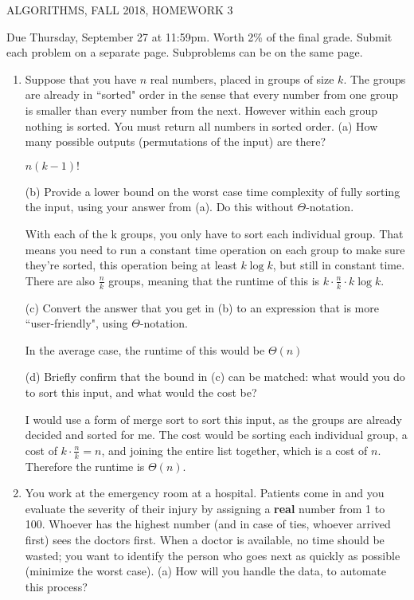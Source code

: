 \documentclass[12pt]{article}
\begin{document}
  
\pagestyle{empty}
 

\begin{center} ALGORITHMS,   FALL 2018, HOMEWORK 3
\end{center}
\noindent Due Thursday, September 27 at 11:59pm.  
Worth 2\% of the final grade.
Submit each problem on a separate page. Subproblems can be on the same page.

\begin{enumerate}

\item   
Suppose that you have $n$ real numbers, placed in groups of size $k$.   The groups are already in ``sorted" order in the sense that every number from one group is smaller than every number from the next.   However within each group nothing is sorted.  
You must return all numbers in sorted order.
(a) How many possible outputs (permutations of the input) are there?

$n(k-1)!$

(b) Provide a lower bound on the worst case time complexity of fully sorting the input, using your answer from (a). Do this without $\Theta$-notation.

With each of the k groups, you only have to sort each individual group. That means you need to 
run a constant time operation on each group to make sure they're sorted, this operation
being at least $k\log k$, but still in constant time. There are also $\frac{n}{k}$ groups,
meaning that the runtime of this is $k \cdot \frac{n}{k} \cdot k \log k$.

(c) Convert the answer that you get in (b) to an expression that is more ``user-friendly", using $\Theta$-notation. 

In the average case, the runtime of this would be $\Theta(n)$

(d) Briefly confirm that the bound in (c) can be matched: what would you do to sort this input, and what would the cost be?

I would use a form of merge sort to sort this input, as the groups are already decided and sorted for me.
The cost would be sorting each individual group, a cost of $k \cdot \frac{n}{k} = n$, and joining
the entire list together, which is a cost of $n$. Therefore the runtime is $\Theta(n)$.

\pagebreak

\item You work at the emergency room at a hospital.  Patients come in and you evaluate the severity of their injury by assigning a {\bf real} number from 1 to 100.   Whoever has the highest number (and in case of ties, whoever arrived first) sees the doctors first.   When a doctor is available, no time should be wasted; you want to identify the person who goes next as quickly as possible (minimize the worst case). 
(a) How will you handle the data,  to automate this process? 



\end{enumerate}
\end{document}
